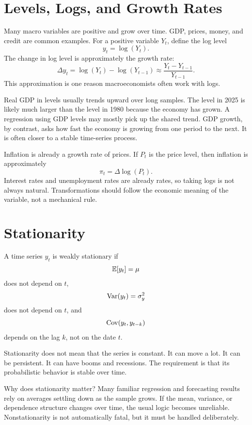 \section{Levels, Logs, and Growth Rates}

Many macro variables are positive and grow over time. GDP, prices, money, and credit are common examples. For a positive variable \(Y_t\), define the log level
\[
    y_t=\log(Y_t).
\]
The change in log level is approximately the growth rate:
\[
    \Delta y_t
    =
    \log(Y_t)-\log(Y_{t-1})
    \approx
    \frac{Y_t-Y_{t-1}}{Y_{t-1}}.
\]
This approximation is one reason macroeconomists often work with logs.

\begin{exmp}
Real GDP in levels usually trends upward over long samples. The level in 2025 is likely much larger than the level in 1980 because the economy has grown. A regression using GDP levels may mostly pick up the shared trend. GDP growth, by contrast, asks how fast the economy is growing from one period to the next. It is often closer to a stable time-series process.
\end{exmp}

Inflation is already a growth rate of prices. If \(P_t\) is the price level, then inflation is approximately
\[
    \pi_t = \Delta \log(P_t).
\]
Interest rates and unemployment rates are already rates, so taking logs is not always natural. Transformations should follow the economic meaning of the variable, not a mechanical rule.

\section{Stationarity}

\begin{defN}
A time series \(y_t\) is weakly stationary if
\[
    \mathbb{E}[y_t]=\mu
\]
does not depend on \(t\),
\[
    \mathrm{Var}(y_t)=\sigma_y^2
\]
does not depend on \(t\), and
\[
    \mathrm{Cov}(y_t,y_{t-k})
\]
depends on the lag \(k\), not on the date \(t\).
\end{defN}

Stationarity does not mean that the series is constant. It can move a lot. It can be persistent. It can have booms and recessions. The requirement is that its probabilistic behavior is stable over time.

Why does stationarity matter? Many familiar regression and forecasting results rely on averages settling down as the sample grows. If the mean, variance, or dependence structure changes over time, the usual logic becomes unreliable. Nonstationarity is not automatically fatal, but it must be handled deliberately.

